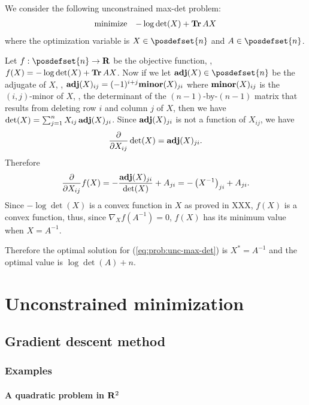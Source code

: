 We consider the following unconstrained max-det problem:
\begin{equation}
\label{eq:prob:unc-max-det}
\begin{array}{ll}
\mbox{minimize} & - \log \det(X) + \mathop{\bf Tr} A X
\end{array}
\end{equation}
where the optimization variable is $X\in\posdefset{n}$ and $A \in \posdefset{n}$.

Let $f:\posdefset{n} \to \reals$ be the objective function,
\ie, $f(X) = - \log \det(X) + \mathop{\bf Tr} A X$.
Now if we let $\adj(X) \in\posdefset{n}$ be the adjugate of $X$,
\ie, $\mathop{\bf adj}(X)_{ij} = (-1)^{i+j} {\bf minor}(X)_{ji}$
where ${\bf minor}(X)_{ij}$ is the $(i,j)$-minor of $X$,
\ie, the determinant of the $(n-1)$-by-$(n-1)$ matrix that results from deleting row $i$ and column $j$ of $X$,
then we have $\det(X) = \sum_{j=1}^n X_{ij} \mathop{\bf adj}(X)_{ji}$.
Since $\mathop{\bf adj}(X)_{ji}$ is not a function of $X_{ij}$,
we have
\begin{equation}
\frac{\partial}{\partial X_{ij}} \det(X) = \mathop{\bf adj}(X)_{ji}.
\end{equation}
Therefore
\begin{equation}
\frac{\partial}{\partial X_{ij}} f(X) = -\frac{\mathop{\bf adj}(X)_{ji}}{\det(X)} + A_{ji}
= - \left(X^{-1}\right)_{ji} + A_{ji}.
\end{equation}
Since $-\log \det(X)$ is a convex function in $X$ as proved in XXX, $f(X)$ is a convex function,
thus, since $\nabla_X f\left(A^{-1}\right)= 0$, $f(X)$ has its minimum value when $X=A^{-1}$.

Therefore the optimal solution for (\ref{eq:prob:unc-max-det}) is $X^\ast = A^{-1}$ and the optimal value is $\log\det(A) + n$.



\section{Unconstrained minimization}
\subsection{Gradient descent method}

\subsubsection{Examples}

\paragraph{A quadratic problem in $\mathbf{R}^2$}

